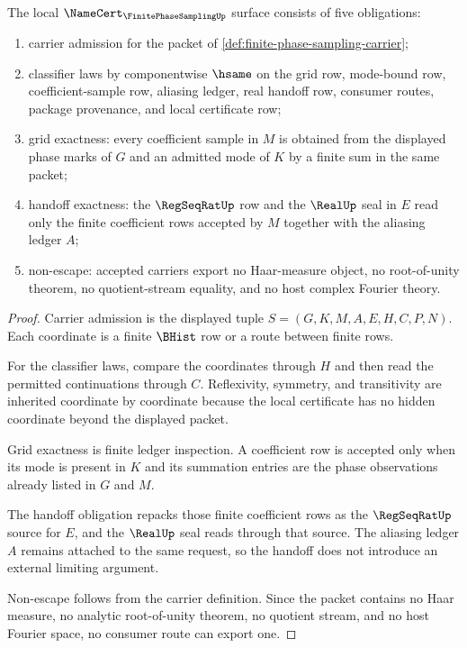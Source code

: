\begin{theorem}
\label{thm:finite-phase-sampling-namecert-obligations}
The local $\NameCert_{\FinitePhaseSamplingUp}$ surface consists of five obligations:
\begin{enumerate}
\item carrier admission for the packet of \autoref{def:finite-phase-sampling-carrier};
\item classifier laws by componentwise $\hsame$ on the grid row, mode-bound row, coefficient-sample row, aliasing ledger, real handoff row, consumer routes, package provenance, and local certificate row;
\item grid exactness: every coefficient sample in $M$ is obtained from the displayed phase marks of $G$ and an admitted mode of $K$ by a finite sum in the same packet;
\item handoff exactness: the $\RegSeqRatUp$ row and the $\RealUp$ seal in $E$ read only the finite coefficient rows accepted by $M$ together with the aliasing ledger $A$;
\item non-escape: accepted carriers export no Haar-measure object, no root-of-unity theorem, no quotient-stream equality, and no host complex Fourier theory.
\end{enumerate}
\end{theorem}
\begin{proof}
Carrier admission is the displayed tuple $S=(G,K,M,A,E,H,C,P,N)$. Each coordinate is a finite $\BHist$ row or a route between finite rows.

For the classifier laws, compare the coordinates through $H$ and then read the permitted continuations through $C$. Reflexivity, symmetry, and transitivity are inherited coordinate by coordinate because the local certificate has no hidden coordinate beyond the displayed packet.

Grid exactness is finite ledger inspection. A coefficient row is accepted only when its mode is present in $K$ and its summation entries are the phase observations already listed in $G$ and $M$.

The handoff obligation repacks those finite coefficient rows as the $\RegSeqRatUp$ source for $E$, and the $\RealUp$ seal reads through that source. The aliasing ledger $A$ remains attached to the same request, so the handoff does not introduce an external limiting argument.

Non-escape follows from the carrier definition. Since the packet contains no Haar measure, no analytic root-of-unity theorem, no quotient stream, and no host Fourier space, no consumer route can export one.
\end{proof}

